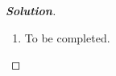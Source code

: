 \documentclass[a4paper,12pt]{article} %
\theoremstyle{plain}
\begin{document}
\begin{proof}[\textbf{Solution}]
\begin{enumerate}[label=\alph*.)]
    \item To be completed.
    \end{enumerate}
\end{proof}
\end{document}

